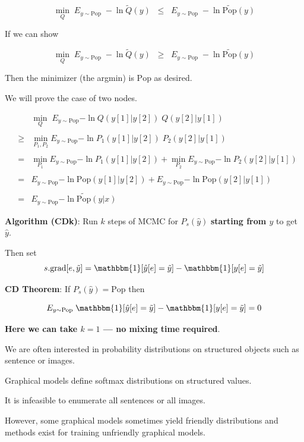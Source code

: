 {
$$\min_{Q} \;E_{y \sim \mathrm{Pop}}\;-\ln \tilde{Q}(y) \;\;\leq \;\; E_{y \sim \mathrm{Pop}}\;-\ln \widetilde{\mathrm{Pop}}(y)$$

\vfill
If we can show

$$\min_{Q} \;E_{y \sim \mathrm{Pop}}\;-\ln \tilde{Q}(y) \;\;\geq \;\; E_{y \sim \mathrm{Pop}}\;-\ln \widetilde{\mathrm{Pop}}(y)$$

Then the minimizer (the argmin) is $\mathrm{Pop}$ as desired.


We will prove the case of two nodes.

\vfill
\begin{eqnarray*}
  & & \min_Q \;E_{y\sim \mathrm{Pop}}{-\ln Q(y[1]|y[2])\;Q(y[2]|y[1])} \\
  \\
  & \geq & \min_{P_1,P_2} E_{y \sim \mathrm{Pop}}{-\ln P_1(y[1]|y[2])\;P_2(y[2]|y[1])} \\
  \\
  & = & \min_{P_1} E_{y \sim \mathrm{Pop}}{-\ln P_1(y[1]|y[2])} + \min_{P_2} E_{y \sim \mathrm{Pop}}{-\ln P_2(y[2]|y[1])} \\
  \\
  & = & E_{y \sim \mathrm{Pop}}{-\ln \mathrm{Pop}(y[1]|y[2])} + E_{y \sim \mathrm{Pop}}{-\ln \mathrm{Pop}(y[2]|y[1])} \\
  \\
  & = & E_{y \sim \mathrm{Pop}}{-\ln \widetilde{\mathrm{Pop}}(y|x)}
\end{eqnarray*}

  
{\bf Algorithm (CDk)}: Run $k$ steps of MCMC for $P_s(\hat{y})$ {\bf starting from $y$} to get $\hat{y}$.

\vfill
Then set
$$s.\mathrm{grad}[e,\tilde{y}] = \mathbbm{1}[\hat{y}[e] = \tilde{y}] - \mathbbm{1}[y[e]= \tilde{y}]$$

\vfill
    {\bf CD Theorem}: If $P_s(\hat{y}) = \mathrm{Pop}$ then
    
    $$E_{y \sim \mathrm{Pop}}\; \mathbbm{1}[\hat{y}[e] = \tilde{y}] - \mathbbm{1}[y[e]= \tilde{y}] = 0$$

\vfill
{\bf Here we can take $k=1$ --- \bf no mixing time required}.


We are often interested in probability distributions on structured objects such as sentence or images.

\vfill
Graphical models define softmax distributions on structured values.

\vfill
It is infeasible to enumerate all sentences or all images.

\vfill
However, some graphical models sometimes yield friendly distributions and methods exist
for training unfriendly graphical models.

}


